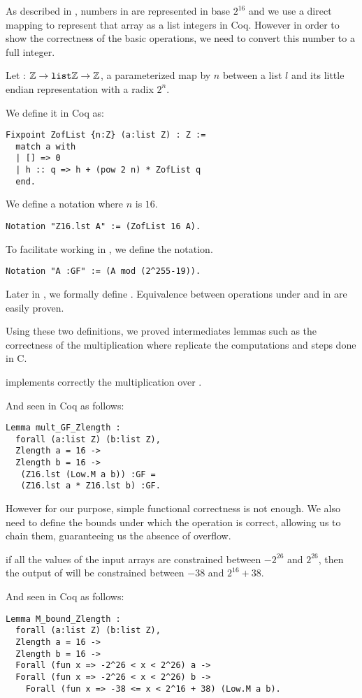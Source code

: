 As described in , numbers in  are represented
in base $2^{16}$ and we use a direct mapping to represent that array as a list
integers in Coq. However in order to show the correctness of the basic operations,
we need to convert this number to a full integer.
\begin{dfn}
Let  : $\mathbb{Z} \rightarrow \texttt{list} \mathbb{Z} \rightarrow \mathbb{Z}$,
a parameterized map by $n$ between a list $l$ and its little endian representation
with a radix $2^n$.
\end{dfn}
We define it in Coq as:
\begin{lstlisting}[language=Coq]
Fixpoint ZofList {n:Z} (a:list Z) : Z :=
  match a with
  | [] => 0
  | h :: q => h + (pow 2 n) * ZofList q
  end.
\end{lstlisting}
We define a notation where $n$ is $16$.
\begin{lstlisting}[language=Coq]
Notation "Z16.lst A" := (ZofList 16 A).
\end{lstlisting}
To facilitate working in \Zfield, we define the  notation.
\begin{lstlisting}[language=Coq]
Notation "A :GF" := (A mod (2^255-19)).
\end{lstlisting}
Later in , we formally define \F{\p}.
Equivalence between operations under  and in \F{\p} are easily proven.

Using these two definitions, we proved intermediates lemmas such as the correctness of the
multiplication  where  replicate the computations and steps done in C.
\begin{lemma}
  \label{lemma:mult_correct}
   implements correctly the multiplication over \Zfield.
\end{lemma}
And seen in Coq as follows:
\begin{lstlisting}[language=Coq]
Lemma mult_GF_Zlength :
  forall (a:list Z) (b:list Z),
  Zlength a = 16 ->
  Zlength b = 16 ->
   (Z16.lst (Low.M a b)) :GF =
   (Z16.lst a * Z16.lst b) :GF.
\end{lstlisting}

However for our purpose, simple functional correctness is not enough.
We also need to define the bounds under which the operation is correct,
allowing us to chain them, guaranteeing us the absence of overflow.

\begin{lemma}
  \label{lemma:mult_bounded}
  if all the values of the input arrays are constrained between $-2^{26}$ and $2^{26}$,
  then the output of  will be constrained between $-38$ and $2^{16} + 38$.
\end{lemma}
And seen in Coq as follows:
\begin{lstlisting}[language=Coq]
Lemma M_bound_Zlength :
  forall (a:list Z) (b:list Z),
  Zlength a = 16 ->
  Zlength b = 16 ->
  Forall (fun x => -2^26 < x < 2^26) a ->
  Forall (fun x => -2^26 < x < 2^26) b ->
    Forall (fun x => -38 <= x < 2^16 + 38) (Low.M a b).
\end{lstlisting}




